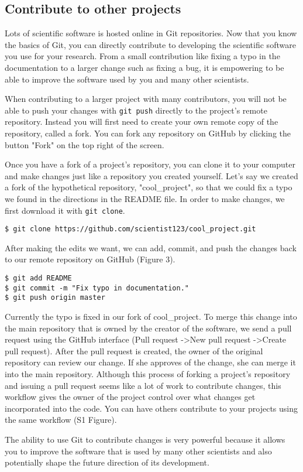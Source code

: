 \subsection{Contribute to other projects}

Lots of scientific software is hosted online in Git repositories.
Now that you know the basics of Git, you can directly contribute to developing the scientific software you use for your research.
From a small contribution like fixing a typo in the documentation to a larger change such as fixing a bug, it is empowering to be able to improve the software used by you and many other scientists.

When contributing to a larger project with many contributors, you will not be able to push your changes with \verb|git push| directly to the project's remote repository.
Instead you will first need to create your own remote copy of the repository, called a fork.
You can fork any repository on GitHub by clicking the button "Fork" on the top right of the screen.

Once you have a fork of a project's repository, you can clone it to your computer and make changes just like a repository you created yourself.
Let's say we created a fork of the hypothetical repository, "cool\_project", so that we could fix a typo we found in the directions in the README file.
In order to make changes, we first download it with \verb|git clone|.

\begin{lstlisting}
$ git clone https://github.com/scientist123/cool_project.git
\end{lstlisting}

After making the edits we want, we can add, commit, and push the changes back to our remote repository on GitHub (Figure 3).

\begin{lstlisting}
$ git add README
$ git commit -m "Fix typo in documentation."
$ git push origin master
\end{lstlisting}

Currently the typo is fixed in our fork of cool\_project.
To merge this change into the main repository that is owned by the creator of the software, we send a pull request using the GitHub interface (Pull request -\textgreater New pull request -\textgreater Create pull request).
After the pull request is created, the owner of the original repository can review our change.
If she approves of the change, she can merge it into the main repository.
Although this process of forking a project’s repository and issuing a pull request seems like a lot of work to contribute changes, this workflow gives the owner of the project control over what changes get incorporated into the code. You can have others contribute to your projects using the same workflow (S1 Figure). 

The ability to use Git to contribute changes is very powerful because it allows you to improve the software that is used by many other scientists and also potentially shape the future direction of its development.
